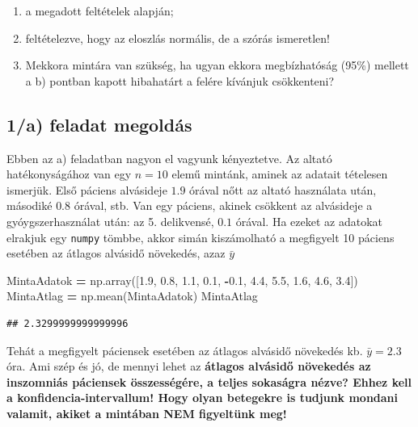 \documentclass[
]{book}
\newenvironment{Shaded}{\begin{snugshade}}{\end{snugshade}}
\newcommand{\FloatTok}[1]{\textcolor[rgb]{0.00,0.00,0.81}{#1}}
\newcommand{\NormalTok}[1]{#1}
\newcommand{\OperatorTok}[1]{\textcolor[rgb]{0.81,0.36,0.00}{\textbf{#1}}}
\providecommand{\tightlist}{%
  \setlength{\itemsep}{0pt}\setlength{\parskip}{0pt}}
\begin{document}
\begin{enumerate}
\def\labelenumi{\alph{enumi})}
\tightlist
\item
  a megadott feltételek alapján;
\item
  feltételezve, hogy az eloszlás normális, de a szórás ismeretlen!
\item
  Mekkora mintára van szükség, ha ugyan ekkora megbízhatóság (95\%) mellett a b) pontban kapott hibahatárt a felére kívánjuk csökkenteni?
\end{enumerate}

\subsection*{1/a) feladat megoldás}\label{a-feladat-megolduxe1s}

Ebben az a) feladatban nagyon el vagyunk kényeztetve. Az altató hatékonyságához van egy \(n=10\) elemű mintánk, aminek az adatait tételesen ismerjük. Első páciens alvásideje \(1.9\) órával nőtt az altató használata után, másodiké \(0.8\) órával, stb. Van egy páciens, akinek csökkent az alvásideje a gyóygszerhasználat után: az 5. delikvensé, \(0.1\) órával.
Ha ezeket az adatokat elrakjuk egy \texttt{numpy} tömbbe, akkor simán kiszámolható a megfigyelt 10 páciens esetében az átlagos alvásidő növekedés, azaz \(\bar{y}\)

\begin{Shaded}
\begin{Highlighting}[]
\NormalTok{MintaAdatok }\OperatorTok{=}\NormalTok{ np.array([}\FloatTok{1.9}\NormalTok{, }\FloatTok{0.8}\NormalTok{, }\FloatTok{1.1}\NormalTok{, }\FloatTok{0.1}\NormalTok{, }\OperatorTok{{-}}\FloatTok{0.1}\NormalTok{, }\FloatTok{4.4}\NormalTok{, }\FloatTok{5.5}\NormalTok{, }\FloatTok{1.6}\NormalTok{, }\FloatTok{4.6}\NormalTok{, }\FloatTok{3.4}\NormalTok{])}
\NormalTok{MintaAtlag }\OperatorTok{=}\NormalTok{ np.mean(MintaAdatok)}
\NormalTok{MintaAtlag}
\end{Highlighting}
\end{Shaded}

\begin{verbatim}
## 2.3299999999999996
\end{verbatim}

Tehát a megfigyelt páciensek esetében az átlagos alvásidő növekedés kb. \(\bar{y}=2.3\) óra. Ami szép és jó, de mennyi lehet az \textbf{átlagos alvásidő növekedés az inszomniás páciensek összességére, a teljes sokaságra nézve? Ehhez kell a konfidencia-intervallum! Hogy olyan betegekre is tudjunk mondani valamit, akiket a mintában NEM figyeltünk meg!}
\end{document}
